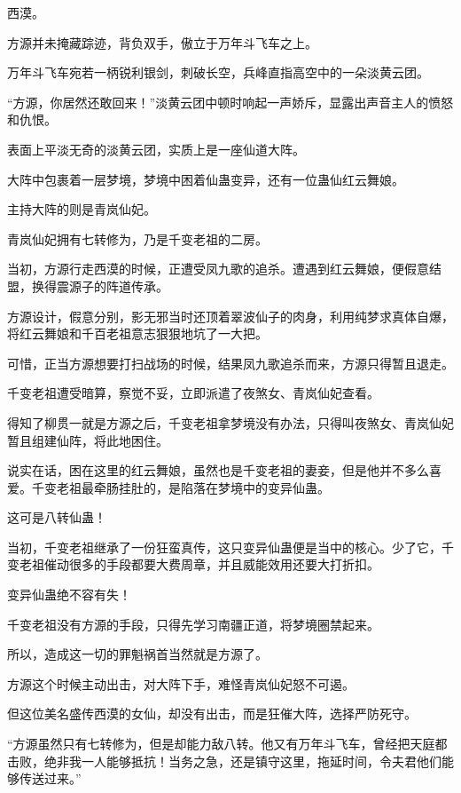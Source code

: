 
\begin{this_body}



西漠。

方源并未掩藏踪迹，背负双手，傲立于万年斗飞车之上。

万年斗飞车宛若一柄锐利银剑，刺破长空，兵峰直指高空中的一朵淡黄云团。

“方源，你居然还敢回来！”淡黄云团中顿时响起一声娇斥，显露出声音主人的愤怒和仇恨。

表面上平淡无奇的淡黄云团，实质上是一座仙道大阵。

大阵中包裹着一层梦境，梦境中困着仙蛊变异，还有一位蛊仙红云舞娘。

主持大阵的则是青岚仙妃。

青岚仙妃拥有七转修为，乃是千变老祖的二房。

当初，方源行走西漠的时候，正遭受凤九歌的追杀。遭遇到红云舞娘，便假意结盟，换得震源子的阵道传承。

方源设计，假意分别，影无邪当时还顶着翠波仙子的肉身，利用纯梦求真体自爆，将红云舞娘和千百老祖意志狠狠地坑了一大把。

可惜，正当方源想要打扫战场的时候，结果凤九歌追杀而来，方源只得暂且退走。

千变老祖遭受暗算，察觉不妥，立即派遣了夜煞女、青岚仙妃查看。

得知了柳贯一就是方源之后，千变老祖拿梦境没有办法，只得叫夜煞女、青岚仙妃暂且组建仙阵，将此地困住。

说实在话，困在这里的红云舞娘，虽然也是千变老祖的妻妾，但是他并不多么喜爱。千变老祖最牵肠挂肚的，是陷落在梦境中的变异仙蛊。

这可是八转仙蛊！

当初，千变老祖继承了一份狂蛮真传，这只变异仙蛊便是当中的核心。少了它，千变老祖催动很多的手段都要大费周章，并且威能效用还要大打折扣。

变异仙蛊绝不容有失！

千变老祖没有方源的手段，只得先学习南疆正道，将梦境圈禁起来。

所以，造成这一切的罪魁祸首当然就是方源了。

方源这个时候主动出击，对大阵下手，难怪青岚仙妃怒不可遏。

但这位美名盛传西漠的女仙，却没有出击，而是狂催大阵，选择严防死守。

“方源虽然只有七转修为，但是却能力敌八转。他又有万年斗飞车，曾经把天庭都击败，绝非我一人能够抵抗！当务之急，还是镇守这里，拖延时间，令夫君他们能够传送过来。”


\end{this_body}

